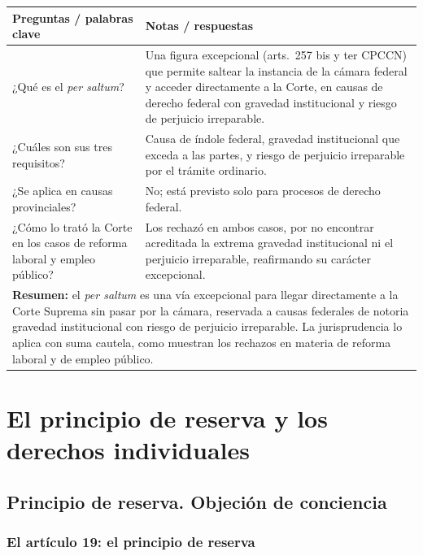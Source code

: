 \documentclass[12pt,oneside]{book}
\begin{document}
\begin{longtable}{@{}p{}p{}@{}}
\toprule
\textbf{Preguntas / palabras clave} & \textbf{Notas / respuestas} \\
\midrule
\endhead
¿Qué es el \textit{per saltum}? & Una figura excepcional (arts.\ 257 bis y ter
CPCCN) que permite saltear la instancia de la cámara federal y acceder
directamente a la Corte, en causas de derecho federal con gravedad institucional
y riesgo de perjuicio irreparable. \\
¿Cuáles son sus tres requisitos? & Causa de índole federal, gravedad
institucional que exceda a las partes, y riesgo de perjuicio irreparable por el
trámite ordinario. \\
¿Se aplica en causas provinciales? & No; está previsto solo para procesos de
derecho federal. \\
¿Cómo lo trató la Corte en los casos de reforma laboral y empleo público? & Los
rechazó en ambos casos, por no encontrar acreditada la extrema gravedad
institucional ni el perjuicio irreparable, reafirmando su carácter excepcional. \\
\midrule
\multicolumn{2}{p{0.95\textwidth}}{\textbf{Resumen:} el \textit{per saltum} es
una vía excepcional para llegar directamente a la Corte Suprema sin pasar por la
cámara, reservada a causas federales de notoria gravedad institucional con
riesgo de perjuicio irreparable. La jurisprudencia lo aplica con suma cautela,
como muestran los rechazos en materia de reforma laboral y de empleo público.} \\
\bottomrule
\end{longtable}

\part{El principio de reserva y los derechos individuales}

\chapter{Principio de reserva. Objeción de conciencia}
\label{cap:p12}

\section{El artículo 19: el principio de reserva}
\end{document}
